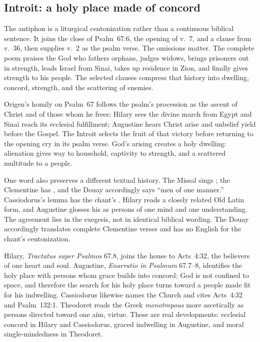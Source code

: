 \subsection*{Introit: a holy place made of concord\enspace{}}

The antiphon is a liturgical centonization rather than a continuous biblical sentence. It joins the close of
Psalm~67:6, the opening of v.~7, and a clause from v.~36, then supplies v.~2
as the psalm verse. The omissions matter. The complete poem praises the God
who fathers orphans, judges widows, brings prisoners out in strength, leads
Israel from Sinai, takes up residence in Zion, and finally gives strength to
his people. The selected clauses compress that history into dwelling,
concord, strength, and the scattering of enemies.

Origen's homily on Psalm~67 follows the psalm's procession as the ascent of
Christ and of those whom he frees; Hilary sees the divine march from Egypt and
Sinai reach its ecclesial fulfillment; Augustine hears Christ arise and
unbelief yield before the Gospel. The Introit selects the fruit of that victory
before returning to the opening cry in its psalm verse. God's arising creates a
holy dwelling: alienation gives way to household, captivity to strength, and a
scattered multitude to a people.

One word also preserves a different textual history. The Missal sings
; the Clementine has ,
and the Douay accordingly says ``men of one manner.'' Cassiodorus's lemma has
the chant's . Hilary reads a closely related Old Latin form,
and Augustine glosses his  as persons of one mind and one
understanding. The agreement lies in the exegesis, not in identical biblical
wording. The Douay accordingly translates complete Clementine verses and has
no English for the chant's centonization.

Hilary, \emph{Tractatus super Psalmos} 67.8, joins the house to Acts~4:32,
the believers of one heart and soul. Augustine, \emph{Enarratio in Psalmum}
67.7--8, identifies the holy place with persons whom grace builds into
concord; God is not confined to space, and therefore the search for his holy
place turns toward a people made fit for his indwelling. Cassiodorus likewise
names the Church and cites Acts~4:32 and Psalm~132:1. Theodoret reads the
Greek \emph{monotropous} more ascetically as persons directed toward one aim,
virtue. These are real developments: ecclesial concord in Hilary and
Cassiodorus, graced indwelling in Augustine, and moral single-mindedness in
Theodoret.

